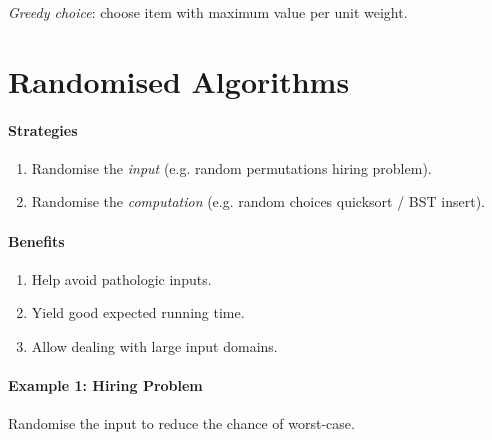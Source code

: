 \documentclass[twocolumn,english]{article}
\numberwithin{equation}{section}
\numberwithin{figure}{section}
\numberwithin{table}{section}
\begin{document}
\emph{Greedy choice}: choose item with maximum value per unit weight.

\section{Randomised Algorithms}

\paragraph{Strategies}
\begin{enumerate}
\item Randomise the \emph{input} (e.g. random permutations \textemdash{}
hiring problem).
\item Randomise the \emph{computation} (e.g. random choices \textemdash{}
quicksort / BST insert).
\end{enumerate}

\paragraph{Benefits}
\begin{enumerate}
\item Help avoid pathologic inputs.
\item Yield good expected running time.
\item Allow dealing with large input domains.
\end{enumerate}

\paragraph{Example 1: Hiring Problem}

Randomise the input to reduce the chance of worst-case.
\end{document}
